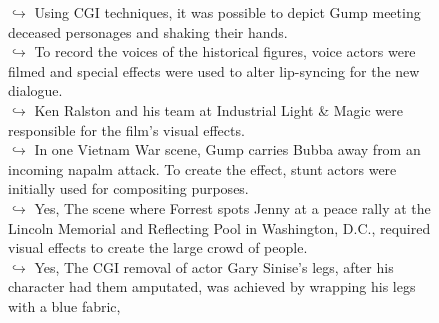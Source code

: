 \documentclass[11pt,a4paper, onecolumn]{article}
\begin{document}
\begin{figure}[t] \small \begin{tcolorbox}[boxsep=0pt,left=5pt,right=0pt,top=2pt,colback = yellow!5] \begin{dialogue}
 \small 
\colorbox{pink!25}{$\hookrightarrow$}
{ Using CGI techniques, it was possible to depict Gump meeting deceased personages and shaking their hands. }
\\
\colorbox{pink!25}{$\hookrightarrow$}
{ To record the voices of the historical figures, voice actors were filmed and special effects were used to alter lip-syncing for the new dialogue. }
\\
\colorbox{pink!25}{$\hookrightarrow$}
{ Ken Ralston and his team at Industrial Light & Magic were responsible for the film's visual effects. }
\\
\colorbox{pink!25}{$\hookrightarrow$}
{ In one Vietnam War scene, Gump carries Bubba away from an incoming napalm attack. To create the effect, stunt actors were initially used for compositing purposes. }
\\
\colorbox{pink!25}{$\hookrightarrow$}
\colorbox{red!25}{Yes,}
{ The scene where Forrest spots Jenny at a peace rally at the Lincoln Memorial and Reflecting Pool in Washington, D.C., required visual effects to create the large crowd of people. }
\\
\colorbox{pink!25}{$\hookrightarrow$}
\colorbox{red!25}{Yes,}
{ The CGI removal of actor Gary Sinise's legs, after his character had them amputated, was achieved by wrapping his legs with a blue fabric, }
\\
 \end{dialogue}\end{tcolorbox}\end{figure}
\end{document}

